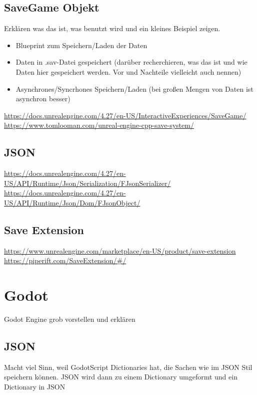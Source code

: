 \subsection{SaveGame Objekt}
Erklären was das ist, was benutzt wird und ein kleines Beispiel zeigen.

\begin{itemize}
    \item Blueprint zum Speichern/Laden der Daten
    \item Daten in .sav-Datei gespeichert (darüber recherchieren, was das ist und wie Daten hier gespeichert werden. Vor und Nachteile vielleicht auch nennen)
    \item Asynchrones/Syncrhones Speichern/Laden (bei großen Mengen von Daten ist asynchron besser)
\end{itemize}

\url{https://docs.unrealengine.com/4.27/en-US/InteractiveExperiences/SaveGame/}\\
\url{https://www.tomlooman.com/unreal-engine-cpp-save-system/}

\subsection{JSON}
\url{https://docs.unrealengine.com/4.27/en-US/API/Runtime/Json/Serialization/FJsonSerializer/}\\
\url{https://docs.unrealengine.com/4.27/en-US/API/Runtime/Json/Dom/FJsonObject/}

\subsection{Save Extension}
\url{https://www.unrealengine.com/marketplace/en-US/product/save-extension}\\
\url{https://piperift.com/SaveExtension/#/}


\section{Godot}
Godot Engine grob vorstellen und erklären

\subsection{JSON}
Macht viel Sinn, weil GodotScript Dictionaries hat, die Sachen wie im JSON Stil speichern 
können. JSON wird dann zu einem Dictionary umgeformt und ein Dictionary in JSON

